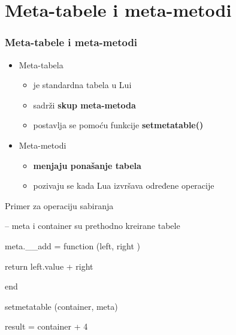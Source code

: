 \documentclass{beamer}
\begin{document}
\section{Meta-tabele i meta-metodi}
\begin{frame}
\frametitle{Meta-tabele i meta-metodi}
\begin{itemize}
\item Meta-tabela
\begin{itemize}
\item je standardna tabela u Lui
\item sadrži \textbf{skup meta-metoda}
\item postavlja se pomoću funkcije \textbf{setmetatable()}
\end{itemize}
\item Meta-metodi
\begin{itemize}
\item \textbf{menjaju ponašanje tabela}
\item pozivaju se kada Lua izvršava određene operacije %
\end{itemize}
\end{itemize}

\begin{block}{Primer za operaciju sabiranja}

\begin{semiverbatim}
-- meta i container su prethodno kreirane tabele

meta.\_\_add = function (left, right )

               \quad return left.value + right

               end


setmetatable (container, meta)

result = container + 4

\end{semiverbatim}
\end{block}

\end{frame}

\end{document}
